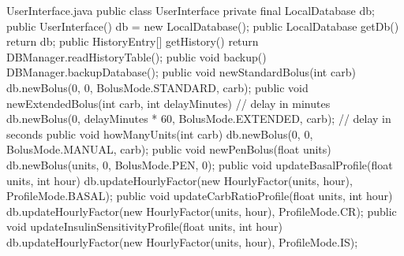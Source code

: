 \begin{javaCode}{UserInterface.java}
public class UserInterface {
    private final LocalDatabase db;
    public UserInterface() { db = new LocalDatabase(); }
    public LocalDatabase getDb() { return db; }
    public HistoryEntry[] getHistory() { return DBManager.readHistoryTable(); }
    public void backup() { DBManager.backupDatabase(); }
    public void newStandardBolus(int carb) { db.newBolus(0, 0, BolusMode.STANDARD, carb); }
    public void newExtendedBolus(int carb, int delayMinutes) { // delay in minutes
        db.newBolus(0, delayMinutes * 60, BolusMode.EXTENDED, carb); // delay in seconds
    }
    public void howManyUnits(int carb) { db.newBolus(0, 0, BolusMode.MANUAL, carb); }
    public void newPenBolus(float units) { db.newBolus(units, 0, BolusMode.PEN, 0); }
    public void updateBasalProfile(float units, int hour) {
        db.updateHourlyFactor(new HourlyFactor(units, hour), ProfileMode.BASAL);
    }
    public void updateCarbRatioProfile(float units, int hour) {
        db.updateHourlyFactor(new HourlyFactor(units, hour), ProfileMode.CR);
    }
    public void updateInsulinSensitivityProfile(float units, int hour) {
        db.updateHourlyFactor(new HourlyFactor(units, hour), ProfileMode.IS);
    }
}
\end{javaCode}